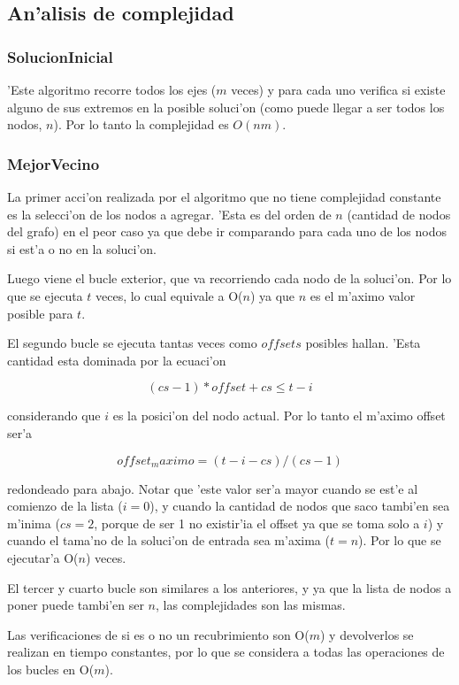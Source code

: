 \subsection{An'alisis de complejidad}
\subsubsection{SolucionInicial}
'Este algoritmo recorre todos los ejes ($m$ veces) y para cada uno verifica si existe alguno de sus extremos en la posible soluci'on (como puede llegar a ser todos los nodos, $n$). Por lo tanto la complejidad es $O(nm)$. 

\subsubsection{MejorVecino}
La primer acci'on realizada por el algoritmo que no tiene complejidad constante es la selecci'on de los nodos a agregar. 'Esta es del orden de $n$ (cantidad de nodos del grafo) en el peor caso ya que debe ir comparando para cada uno de los nodos si est'a o no en la soluci'on.

Luego viene el bucle exterior, que va recorriendo cada nodo de la soluci'on. Por lo que se ejecuta $t$ veces, lo cual equivale a O($n$) ya que $n$ es el m'aximo valor posible para $t$.

El segundo bucle se ejecuta tantas veces como $offsets$ posibles hallan. 'Esta cantidad esta dominada por la ecuaci'on

$$(cs - 1) * offset + cs \leq t - i$$

considerando que $i$ es la posici'on del nodo actual. Por lo tanto el m'aximo offset ser'a

$$offset_maximo = (t - i - cs) / (cs - 1)$$

redondeado para abajo. Notar que 'este valor ser'a mayor cuando se est'e al comienzo de la lista ($i=0$),  y cuando la cantidad de nodos que saco tambi'en sea m'inima ($cs=2$, porque de ser 1 no existir'ia el offset ya que se toma solo a $i$) y cuando el tama'no de la soluci'on de entrada sea m'axima ($t=n$). Por lo que se ejecutar'a O($n$) veces.

El tercer y cuarto bucle son similares a los anteriores, y ya que la lista de nodos a poner puede tambi'en ser $n$, las complejidades son las mismas.

Las verificaciones de si es o no un recubrimiento son O($m$) y devolverlos se realizan en tiempo constantes, por lo que se considera a todas las operaciones de los bucles en O($m$).

